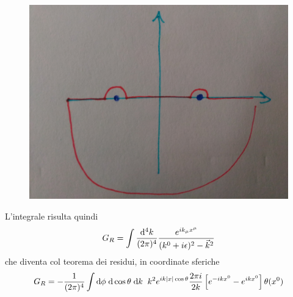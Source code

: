\begin{figure}[htbp]
 \centering
 \includegraphics[angle=90, width=\textwidth]{images/foglio5_circuito}
	\caption*{}
 \label{figure:green}
\end{figure}

L'integrale risulta quindi
\[ G_R = \int \frac{\mathrm{d} ^4k}{(2\pi)^4} \frac{e^{ik_\mu x^\mu}}{ (k^0+i\epsilon)^2 - \vec{k}^2 } \]
che diventa col teorema dei residui, in coordinate sferiche
\[ G_R = -\frac{1}{(2\pi)^4} \int \mathrm{d} \phi \; \mathrm{d} \cos\theta \;\mathrm{d} k \;\; k^2 e^{ ik|x|\cos\theta} \frac{2\pi i}{2k} \left[e^{-ikx^0} - e^{ikx^0}\right] \theta(x^0)    \]
